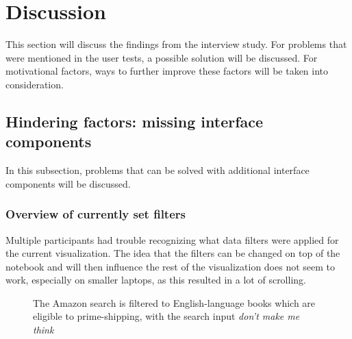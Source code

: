 \section{Discussion}
This section will discuss the findings from the interview study. For problems that were mentioned in the user tests, a possible solution will be discussed. For motivational factors, ways to further improve these factors will be taken into consideration.

\subsection{Hindering factors: missing interface components}
In this subsection, problems that can be solved with additional interface components will be discussed.

\subsubsection*{Overview of currently set filters}
Multiple participants had trouble recognizing what data filters were applied for the current visualization. The idea that the filters can be changed on top of the notebook and will then influence the rest of the visualization does not seem to work, especially on smaller laptops, as this resulted in a lot of scrolling.

\begin{figure}[htbp]
    \caption{The Amazon search is filtered to English-language books which are eligible to prime-shipping, with the search input \emph{don't make me think}}
    \label{fig:amazon_filters}
\end{figure}


